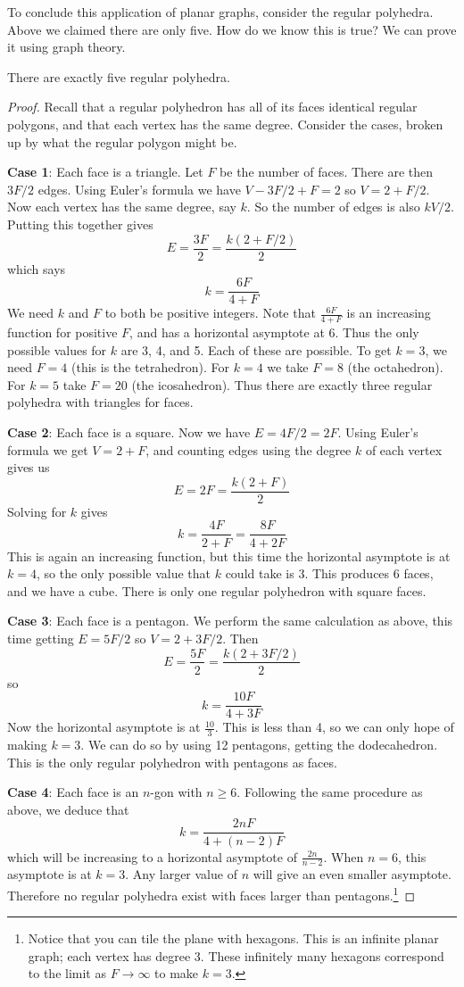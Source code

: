 \documentclass[12pt]{article}
\begin{document}
To conclude this application of planar graphs, consider the regular polyhedra.  Above we claimed there are only five.  How do we know this is true?  We can prove it using graph theory.

\begin{theorem}
There are exactly five regular polyhedra.
\end{theorem}


\begin{proof}
Recall that a regular polyhedron has all of its faces identical regular polygons, and that each vertex has the same degree.   Consider the cases, broken up by what the regular polygon might be.

\textbf{Case 1}: Each face is a triangle.  Let $F$ be the number of faces.  There are then $3F/2$ edges.  Using Euler's formula we have $V - 3F/2 + F = 2$ so $V = 2 + F/2$.  Now each vertex has the same degree, say $k$.  So the number of edges is also $kV/2$.  Putting this together gives \[E = \frac{3F}{2} = \frac{k(2+F/2)}{2}\] which says 
\[k = \frac{6F}{4+F}\]
We need $k$ and $F$ to both be positive integers.  Note that $\frac{6F}{4+F}$ is an increasing function for positive $F$, and has a horizontal asymptote at 6.  Thus the only possible values for $k$ are 3, 4, and 5.  Each of these are possible.  To get $k = 3$, we need $F = 4$ (this is the tetrahedron).  For $k = 4$ we take $F = 8$ (the octahedron).  For $k = 5$ take $F = 20$ (the icosahedron).  Thus there are exactly three regular polyhedra with triangles for faces.

\textbf{Case 2}: Each face is a square.  Now we have $E = 4F/2 = 2F$.  Using Euler's formula we get $V = 2 + F$, and counting edges using the degree $k$ of each vertex gives us
\[E = 2F = \frac{k(2+F)}{2}\]
Solving for $k$ gives 
\[k = \frac{4F}{2+F} = \frac{8F}{4+2F}\]
This is again an increasing function, but this time the horizontal asymptote is at $k = 4$, so the only possible value that $k$ could take is 3.  This produces 6 faces, and we have a cube.  There is only one regular polyhedron with square faces.

\textbf{Case 3}: Each face is a pentagon.  We perform the same calculation as above, this time getting $E = 5F/2$ so $V = 2 + 3F/2$.  Then
\[E = \frac{5F}{2} = \frac{k(2+3F/2)}{2}\]
so
\[k = \frac{10F}{4+3F}\]
Now the horizontal asymptote is at $\frac{10}{3}$.  This is less than 4, so we can only hope of making $k = 3$.  We can do so by using 12 pentagons, getting the dodecahedron.  This is the only regular polyhedron with pentagons as faces.

\textbf{Case 4}: Each face is an $n$-gon with $n \ge 6$.  Following the same procedure as above, we deduce that
\[k = \frac{2nF}{4+(n-2)F}\]
which will be increasing to a horizontal asymptote of $\frac{2n}{n-2}$.  When $n = 6$, this asymptote is at $k = 3$.  Any larger value of $n$ will give an even smaller asymptote.  Therefore no regular polyhedra exist with faces larger than pentagons.\footnote{Notice that you can tile the plane with hexagons.  This is an infinite planar graph; each vertex has degree 3.  These infinitely many hexagons correspond to the limit as $F \to \infty$ to make $k = 3$.}
\end{proof}
\end{document}
